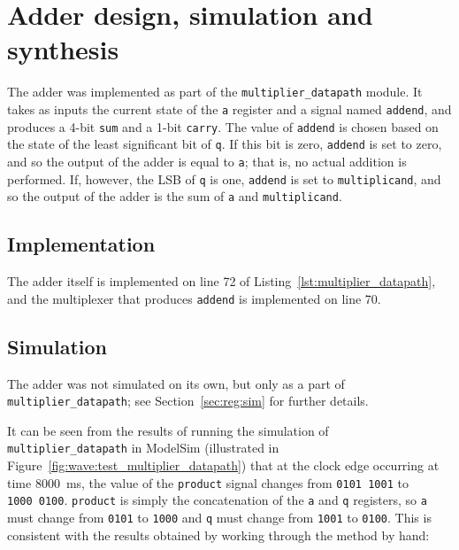 \documentclass[a4paper]{article}
\begin{document}
\section{Adder design, simulation and synthesis}
\label{sec:adder}

The adder was implemented as part of the \texttt{multiplier\_datapath} module. It takes as inputs the current state of the \texttt{a} register and a signal named \texttt{addend}, and produces a 4-bit \texttt{sum} and a 1-bit \texttt{carry}. The value of \texttt{addend} is chosen based on the state of the least significant bit of \texttt{q}. If this bit is zero, \texttt{addend} is set to zero, and so the output of the adder is equal to \texttt{a}; that is, no actual addition is performed. If, however, the LSB of \texttt{q} is one, \texttt{addend} is set to \texttt{multiplicand}, and so the output of the adder is the sum of \texttt{a} and \texttt{multiplicand}.

\subsection{Implementation}
\label{sec:adder:impl}

The adder itself is implemented on line 72 of Listing~\ref{lst:multiplier_datapath}, and the multiplexer that produces \texttt{addend} is implemented on line 70.

\subsection{Simulation}
\label{sec:adder:sim}

The adder was not simulated on its own, but only as a part of \texttt{multiplier\_datapath}; see Section~\ref{sec:reg:sim} for further details.

It can be seen from the results of running the simulation of \texttt{multiplier\_datapath} in ModelSim (illustrated in Figure~\ref{fig:wave:test_multiplier_datapath}) that at the clock edge occurring at time \SI{8000}{\milli\second}, the value of the \texttt{product} signal changes from \texttt{0101~1001} to \texttt{1000~0100}. \texttt{product} is simply the concatenation of the \texttt{a} and \texttt{q} registers, so \texttt{a} must change from \texttt{0101} to \texttt{1000} and \texttt{q} must change from \texttt{1001} to \texttt{0100}. This is consistent with the results obtained by working through the method by hand:
\end{document}
